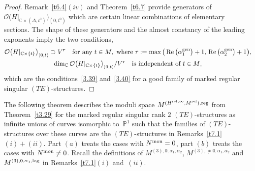 \documentclass[10pt,a4paper]{amsart}
\numberwithin{equation}{section}
\numberwithin{figure}{section}
\newcommand{\C}{{\mathbb C}}
\renewcommand{\P}{{\mathbb P}}
\newcommand{\OO}{{\mathcal O}}
\DeclareMathOperator{\Ree}{Re}
\begin{document}
\begin{proof}
Remark~\ref{t6.4}$(iv)$ and Theorem~\ref{t6.7}
provide generators of $\OO\big(H|_{\C\times(\Delta,t^0)}\big)_{(0,t^0)}$
which are certain linear combinations of elementary sections.
The shape of these generators and the almost constancy
of the leading exponents imply the two conditions,
\begin{gather*}%
\OO\big(H|_{\C\times\{t\}}\big)_{(0,t)}\supset V^r\quad
\text{for any}\ t\in M,
\ \text{where} \
r:=\max\big(\Ree\big(\alpha_1^{\rm gen}\big)+1,\,\Ree\big(\alpha_2^{\rm gen}\big)+1\big),\\
\dim_\C\OO\big(H|_{\C\times\{t\}}\big)_{(0,t)}/V^r \quad
\text{is independent of $t\in M$}, %
\end{gather*}
which are the conditions~\eqref{3.39} and~\eqref{3.40}
for a good family of marked regular singular
$(TE)$-structures.
\end{proof}


The following theorem describes the moduli space
$M^{(H^{{\rm ref},\infty},M^{\rm ref}),{\rm reg}}$ from Theorem~\ref{t3.29}
for the marked regular singular rank $2$ $(TE)$-structures as infinite
unions of curves isomorphic to~$\P^1$ such that the families of
$(TE)$-structures over these curves are the $(TE)$-structures
in Remarks~\ref{t7.1}$(i){+}(ii)$.
Part $(a)$ treats the cases with $N^{\rm mon}=0$,
part $(b)$ treats the cases with $N^{\rm mon}\neq 0$.
Recall the definitions of $M^{(3),0,\alpha_1,\alpha_2}$,
$M^{(3),\neq 0,\alpha_1,\alpha_2}$ and
$M^{(3),0,\alpha_1,{\rm log}}$ in Remarks~\ref{t7.1}$(i)$ and~$(ii)$.
\end{document}

